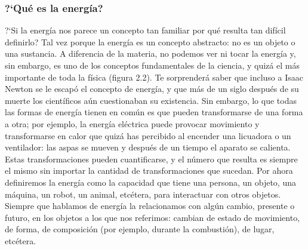 \documentclass[11pt]{book}
\begin{document}

\subsubsection{?`Qu\'e es la energ\'ia?}
?`Si la energ\'ia nos parece un concepto tan familiar por qu\'e resulta tan
dif\'icil definirlo? Tal vez porque la energ\'ia es un concepto abstracto: no
es un objeto o una sustancia. A diferencia de la materia, no podemos
ver ni tocar la energ\'ia y, sin embargo, es uno de los conceptos fundamentales
de la ciencia, y quiz\'a el m\'as importante de toda la f\'isica (figura 2.2). Te
sorprender\'a saber que incluso a Isaac Newton se le escap\'o
el concepto de energ\'ia, y que m\'as de un siglo despu\'es de su muerte los
cient\'ificos a\'un cuestionaban su existencia.
Sin embargo, lo que todas las formas de energ\'ia tienen en com\'un es
que pueden transformarse de una forma a otra; por ejemplo, la energ\'ia
el\'ectrica puede provocar movimiento y transformarse en calor que quiz\'a
has percibido al encender una licuadora o un ventilador: las aspas se mueven y
despu\'es de un tiempo el aparato se calienta. Estas transformaciones
pueden cuantificarse, y el n\'umero que resulta es siempre el mismo sin importar
la cantidad de transformaciones que sucedan.
Por ahora definiremos la energ\'ia como la capacidad que tiene una
persona, un objeto, una m\'aquina, un robot, un animal, etc\'etera, para
interactuar con otros objetos. Siempre que hablamos de energ\'ia la relacionamos
con alg\'un cambio, presente o futuro, en los objetos a los que nos
referimos: cambian de estado de movimiento, de forma, de composici\'on (por
ejemplo, durante la combusti\'on), de lugar, etc\'etera.
\end{document}
